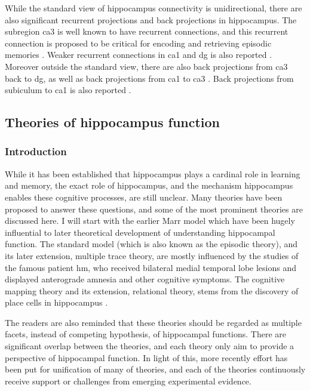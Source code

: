 While the standard view of hippocampus connectivity is unidirectional, there are also significant recurrent projections and back projections in hippocampus. The subregion \gls{ca3} is well known to have recurrent connections, and this recurrent connection is proposed to be critical for encoding and retrieving episodic memories \citep{nakazawa02, rolls07}. Weaker recurrent connections in \gls{ca1} and \gls{dg} is also reported \citep{swanson81, ishizuka90, buckmaster93}. Moreover outside the standard view, there are also back projections from \gls{ca3} back to \gls{dg}, as well as back projections from \gls{ca1} to \gls{ca3} \citep{swanson81, li94}. Back projections from subiculum to \gls{ca1} is also reported \citep{finch83}. 

\subsection{Theories of hippocampus function}
\subsubsection{Introduction}
While it has been established that hippocampus plays a cardinal role in learning and memory, the exact role of hippocampus, and the mechanism hippocampus enables these cognitive processes, are still unclear. Many theories have been proposed to answer these questions, and some of the most prominent theories are discussed here. I will start with the earlier Marr model \citep{marr71} which have been hugely influential to later theoretical development of understanding hippocampal function. The standard model (which is also known as the episodic theory), and its later extension, multiple trace theory, are mostly influenced by the studies of the famous patient \gls{hm}, who received bilateral medial temporal lobe lesions and displayed anterograde amnesia and other cognitive symptoms. The cognitive mapping theory and its extension, relational theory, stems from the discovery of place cells in hippocampus \citep{o'keefe71}. 

The readers are also reminded that these theories should be regarded as multiple facets, instead of competing hypothesis, of hippocampal functions. There are significant overlap between the theories, and each theory only aim to provide a perspective of hippocampal function. In light of this, more recently effort has been put for unification of many of theories, and each of the theories continuously receive support or challenges from emerging experimental evidence.

